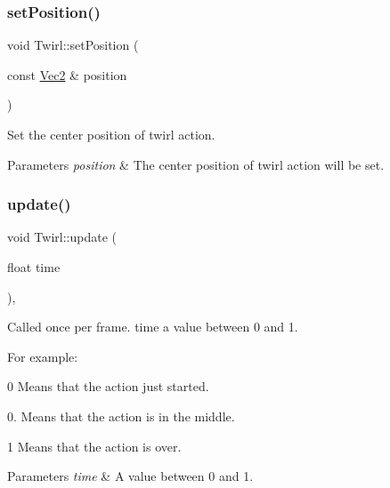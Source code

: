 \subsubsection{\texorpdfstring{set\+Position()}{setPosition()}\hspace{0.1cm}{\footnotesize\ttfamily [2/2]}}
{\footnotesize\ttfamily void Twirl\+::set\+Position (\begin{DoxyParamCaption}\item[{const \hyperlink{classVec2}{Vec2} \&}]{position }\end{DoxyParamCaption})}



Set the center position of twirl action. 


\begin{DoxyParams}{Parameters}
{\em position} & The center position of twirl action will be set. \\
\hline
\end{DoxyParams}
\mbox{\label{classTwirl_a5f8f817299b42802d69bf94be42bc858}} 
\subsubsection{\texorpdfstring{update()}{update()}\hspace{0.1cm}{\footnotesize\ttfamily [1/2]}}
{\footnotesize\ttfamily void Twirl\+::update (\begin{DoxyParamCaption}\item[{float}]{time }\end{DoxyParamCaption})\hspace{0.3cm}{\ttfamily [override]}, {\ttfamily [virtual]}}

Called once per frame. time a value between 0 and 1.

For example\+:
\begin{DoxyItemize}
\item 0 Means that the action just started.
\item 0. Means that the action is in the middle.
\item 1 Means that the action is over.
\end{DoxyItemize}


\begin{DoxyParams}{Parameters}
{\em time} & A value between 0 and 1. \\
\hline
\end{DoxyParams}


